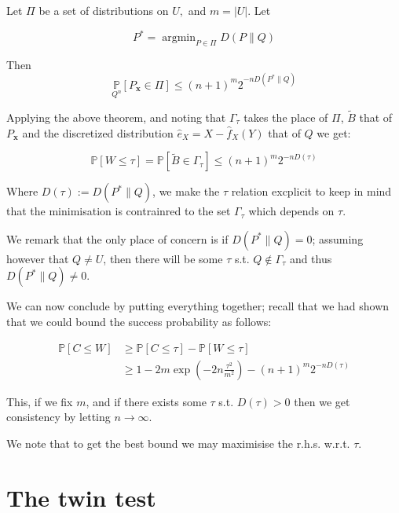 \begin{theorem}\label{sanov}

    Let $\Pi$ be a set of distributions on $U,$ and $m=|U| .$ Let

    \[
        P^{*}=\operatorname{argmin}_{P \in \Pi} D(P \| Q)
    \]
    
    Then
    \[
        \underset{Q^{n}}{\mathbb{P}}\left[P_{\mathbf{x}} \in \Pi\right] \leq(n+1)^{m} 2^{-nD\left(P^{*} \| Q\right)}
    \]
    
\end{theorem}

Applying the above theorem, and noting that $\Gamma_\tau$ takes the place of $\Pi$, $\tilde{B}$ that of $P_{\mathbf{x}}$
and the discretized distribution $\hat{e}_X = X - \hat{f}_X(Y)$ that of $Q$ we get:

\begin{equation}
    \mathbb{P}\left[W \leq \tau \right] = \mathbb{P}\left[ \tilde{B} \in \Gamma_\tau \right] 
    \leq (n+1)^{m} 2^{-nD\left( \tau \right)}
\end{equation}

Where $D\left( \tau \right) := D\left(P^{*} \| Q\right)$, we make the $\tau$ relation excplicit to 
keep in mind that the minimisation is contrainred to the set $\Gamma_\tau$ which depends on $\tau$.

We remark that the only place of concern is if $D\left(P^{*} \| Q\right) = 0$; assuming however that $Q \neq U$, then 
there will be some $\tau$ s.t. $Q \notin \Gamma_\tau$ and thus $D\left(P^{*} \| Q\right) \neq 0$.

We can now conclude by putting everything together; recall that we had shown that we could bound the success probability 
as follows:



\begin{align}
    \mathbb{P}\left[C \leq W\right] &\geq \mathbb{P}\left[C \leq \tau \right] - \mathbb{P}\left[W \leq \tau \right] \\
    &\geq 1 - 2m\exp \left( -2n \frac{\tau^2}{m^2} \right) - (n+1)^{m} 2^{-nD\left( \tau \right)}
\end{align}

This, if we fix $m$, and if there exists some $\tau$ s.t. $D\left( \tau \right) > 0$ then we get consistency
by letting $n \rightarrow \infty$.

We note that to get the best bound we may maximisise the r.h.s. w.r.t. $\tau$.

\section{The twin test}

